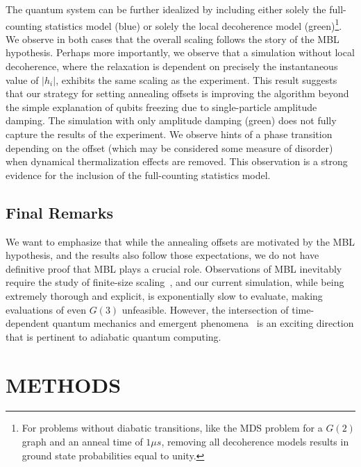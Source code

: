 \documentclass[10pt]{iopart}
\begin{document}
The quantum system can be further idealized by including either solely the full-counting statistics model (blue) or solely the local decoherence model (green)\footnote{For problems without diabatic transitions, like the MDS problem for a $G(2)$ graph and an anneal time of $1\mu s$, removing all decoherence models results in ground state probabilities equal to unity.}. We observe in both cases that the overall scaling follows the story of the MBL hypothesis. Perhaps more importantly, we observe that a simulation without local decoherence, where the relaxation is dependent on precisely the instantaneous value of $|h_i|$, exhibits the same scaling as the experiment. This result suggests that our strategy for setting annealing offsets is improving the algorithm beyond the simple explanation of qubits freezing due to single-particle amplitude damping. The simulation with only amplitude damping (green) does not fully capture the results of the experiment. We observe hints of a phase transition depending on the offset (which may be considered some measure of disorder) when dynamical thermalization effects are removed. This observation is a strong evidence for the inclusion of the full-counting statistics model.

\subsection{Final Remarks}
\label{sec:results:final}
We want to emphasize that while the annealing offsets are motivated by the MBL hypothesis, and the results also follow those expectations, we do not have definitive proof that MBL plays a crucial role.
Observations of MBL inevitably require the study of finite-size scaling~\cite{2015PhRvB..91h1103L}, and our current simulation, while being extremely thorough and explicit, is exponentially slow to evaluate, making evaluations of even $G(3)$ unfeasible.
However, the intersection of time-dependent quantum mechanics and emergent phenomena~\cite{Goldenfeld:1992qy} is an exciting direction that is pertinent to adiabatic quantum computing.

\section{METHODS}
\label{sec:methods}
\end{document}
